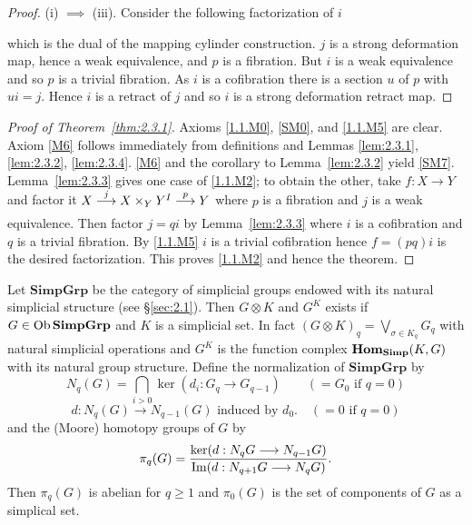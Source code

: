 \documentclass[../main]{subfiles}
\begin{document}
\begin{proof}
(i) $\implies$ (iii). Consider the following factorization of $i$
\begin{center}
\end{center} 
which is the dual of the mapping cylinder construction. $j$ is a strong deformation map, hence a weak equivalence, and $p$ is a fibration. But $i$ is a weak equivalence and so $p$ is a trivial fibration. As $i$ is a cofibration there is a section $u$ of $p$ with $ui = j$. Hence $i$ is a retract of $j$ and so $i$ is a strong deformation retract map. 
\end{proof} 

\begin{proof}[Proof of Theorem~\ref{thm:2.3.1}]
Axioms \ref{1.1.M0}, \ref{SM0}, and \ref{1.1.M5} are clear. Axiom \ref{M6} follows immediately from definitions and Lemmas \ref{lem:2.3.1}, \ref{lem:2.3.2}, \ref{lem:2.3.4}. \ref{M6} and the corollary to Lemma~\ref{lem:2.3.2} yield \ref{SM7}. Lemma~\ref{lem:2.3.3} gives one case of \ref{1.1.M2}; to obtain the other, take $f \colon X \to Y$ and factor it $X \varrightarrow{j} X \times_Y Y^I \varrightarrow{p} Y$ where $p$ is a fibration and $j$ is a weak equivalence. Then factor $j = qi$ by Lemma~\ref{lem:2.3.3} where $i$ is a cofibration and $q$ is a trivial fibration. By \ref{1.1.M5} $i$ is a trivial cofibration hence $f = (pq)i$ is the desired factorization. This proves \ref{1.1.M2} and hence the theorem.
\end{proof} 
Let \(\mathbf{Simp Grp}\) be the category of simplicial groups endowed with its natural simplicial structure (see \S\ref{sec:2.1}). Then \(G\otimes K\) and \(G^K\) exists if \(G\in \operatorname{Ob} \mathbf{Simp Grp}\) and \(K\) is a simplicial set. In fact $(G\otimes K)_q = \bigvee_{\sigma\in K_q} G_q$ with natural simplicial operations and $G^K$ is the function complex $\operatorname{\mathbf{Hom}}_{\mathbf{Simp}}(K,G)$ with its natural group structure. Define the normalization of $\mathbf{Simp Grp}$ by
\[N_q(G) = \bigcap_{i>0}\ker(d_i:G_q\longrightarrow G_{q-1})\quad \quad (=G_0\text{   if   } q=0)\]
\[d:N_q(G)\longrightarrow N_{q-1}(G)\text{   induced by  } d_0.\quad (=0\text{   if   } q=0)\]
and the (Moore) homotopy groups of $G$ by
    \[\pi_{q}(G) = \frac{\ker(d : N_{q}G \longrightarrow N_{q-1}G)}{\operatorname{Im}(d : N_{q+1}G \longrightarrow N_{q}G)}.\]
Then $\pi_{q}(G)$ is abelian for $q \geq 1$ and $\pi_{0}(G)$ is the set of components of $G$ as a simplical set. 
\end{document}
